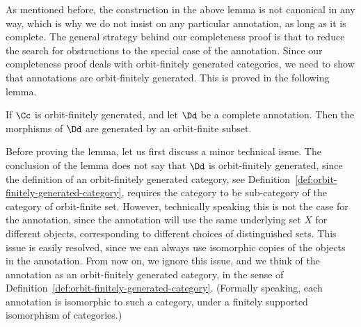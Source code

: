 As mentioned before, the construction in the above lemma is not canonical in any way, which is why we do not insist on any particular annotation, as long as it is complete. The general strategy behind our completeness proof is that to reduce the search for obstructions to the special case of the annotation.  Since our completeness proof deals with orbit-finitely generated categories, we need to show that annotations are orbit-finitely generated. This is proved in the following lemma.



\begin{lemma}\label{lem:annotation-orbit-finitely-generated}
    If $\Cc$ is orbit-finitely generated, and let $\Dd$ be a complete annotation. Then the morphisms of $\Dd$ are generated by  an orbit-finite subset.
\end{lemma}

Before proving the lemma, let us first discuss a minor technical issue. 
The conclusion of the lemma does not say that $\Dd$ is orbit-finitely generated, since the definition of an orbit-finitely generated category, see Definition~\ref{def:orbit-finitely-generated-category},  requires the category to be sub-category of the category of orbit-finite set. However, technically speaking this is not the case for the annotation, since the annotation will use the same underlying set $X$ for different objects, corresponding to different choices of distinguished sets.  This issue is easily resolved, since we can always use isomorphic copies of the objects in the annotation. From now on, we ignore this issue, and we think of the annotation as an orbit-finitely generated category, in the sense of Definition~\ref{def:orbit-finitely-generated-category}. (Formally speaking, each annotation is isomorphic to such a category, under a finitely supported isomorphism of categories.)

